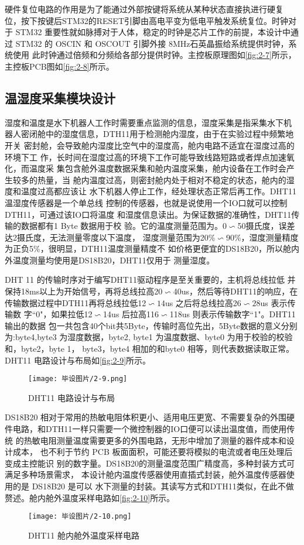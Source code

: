硬件复位电路的作用是为了能通过外部按键将系统从某种状态直接执进行硬复
位，按下按键后STM32的RESET引脚由高电平变为低电平触发系统复位。时钟对于
STM32 重要性就如脉搏对于人体，稳定的时钟是芯片工作的前提，本设计中通过
STM32 的 OSCIN 和 OSCOUT 引脚外接 8MHz石英晶振给系统提供时钟，系统使用
此时钟通过倍频和分频给各部分提供时钟。主控板原理图如\autoref{fig:2-7}所示，主控板PCB图如\autoref{fig:2-8}所示。

\subsection{温湿度采集模块设计}

湿度和温度是水下机器人工作时需要重点监测的信息，湿度采集是指采集水下机
器人密闭舱中的湿度信息，DTH11用于检测舱内湿度，由于在实验过程中频繁地开关
密封舱，会导致舱内湿度比空气中的湿度高，舱内电路不适宜在湿度过高的环境下工
作，长时间在湿度过高的环境下工作可能导致线路短路或者焊点加速氧化，而温度采
集包含舱外温度数据采集和舱内温度采集，舱内设备在工作时会产生较多的热量，当
舱内温度过高，则密封舱内处于相对不稳定的状态，舱内的湿度和温度过高都应该让
水下机器人停止工作，经处理状态正常后再工作。DHT11温湿度传感器是一个单总线
控制的传感器，也就是说使用一个IO口就可以控制DTH11，可通过该IO口将温度
和湿度信息读出。为保证数据的准确性，DHT11传输的数据都有1 Byte 数据用于校
验。它的温度测量范围为。0$\backsim $50摄氏度，误差达2摄氏度，无法测量零度以下温度，
湿度测量范围为20\%$\backsim$90\%，湿度测量精度为正负5\%，很明显，DTH11温度测量精度不
如价格更便宜的DS18B20，所以舱内外温度测量均使用是DS18B20，DHT11仅用于
测量湿度。 

DHT 11 的传输时序对于编写DHT11驱动程序是至关重要的，主机将总线拉低
并保持18ms以上为开始信号，再将总线拉高20$\backsim$40us，然后等待DHT11的响应，在
传输数据过程中DTH11再将总线拉低12$\backsim14$us 之后将总线拉高26$\backsim28$us 表示传输数
字“0"，如果拉低12$\backsim$14us 后拉高116$\backsim$118us 则表示传输数字“1"。DHT11 输出的数据
包一共包含40个bit共5Byte，传输时高位先出，5Byte数据的意义分别为:byte4,byte3
为湿度数据，byte2, byte1 为温度数据、byte0 为用于校验的校验和，byte2，byte 1，
byte3，byte4 相加的和byte0 相等，则代表数据读取正常。DHT11 电路设计与布局如\autoref{fig:2-9}所示。
\begin{figure}[htbp]
    \centering
    \texttt{[image: 毕设图片/2-9.png]}
    \caption{\label{fig:2-9}DHT11 电路设计与布局}
\end{figure}

DS18B20 相对于常用的热敏电阻体积更小、适用电压更宽、不需要复杂的外围硬
件电路，和DTH11一样只需要一个微控制器的IO口便可以读出温度值，而使用传统
的热敏电阻测量温度需要更多的外围电路，无形中增加了测量的器件成本和设计成本，
也不利于节约 PCB 板面面积，可能还要将模拟的电流或者电压处理后变成主控能识
别的数字量。DS18B20的测量温度范围广精度高，多种封装方式可满足多种场景需求，
本设计舱内温度传感器使用直插式封装，舱外温度传感器使用的是 DS18B20 是可以
水下测量的封装。其读写方式和DTH11类似，在此不做赘述。舱内舱外温度采样电路如\autoref{fig:2-10}所示。
\begin{figure}[htbp]
    \centering
    \texttt{[image: 毕设图片/2-10.png]}
    \caption{\label{fig:2-10}DHT11 舱内舱外温度采样电路}
\end{figure}

